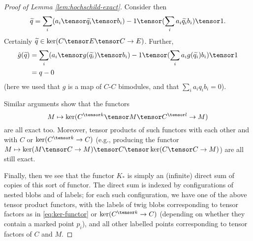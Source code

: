 \begin{proof}[Proof of Lemma \ref{lem:hochschild-exact}]
Consider then $$\widetilde{q} = \sum_i (a_i \tensor \widetilde{q_i} \tensor b_i) - 1 \tensor (\sum_i a_i \widetilde{q_i} b_i) \tensor 1.$$ Certainly
$\widetilde{q} \in \ker(C \tensor E \tensor C \to E)$. Further,
\begin{align*}
\hat{g}(\widetilde{q}) & = \sum_i (a_i \tensor g(\widetilde{q_i}) \tensor b_i) - 1 \tensor (\sum_i a_i g(\widetilde{q_i}) b_i) \tensor 1 \\
                       & = q - 0
\end{align*}
(here we used that $g$ is a map of $C$-$C$ bimodules, and that $\sum_i a_i q_i b_i = 0$).

Similar arguments show that the functors
\begin{equation}
\label{eq:ker-functor}%
M \mapsto \ker(C^{\tensor k} \tensor M \tensor C^{\tensor l} \to M)
\end{equation}
are all exact too. Moreover, tensor products of such functors with each
other and with $C$ or $\ker(C^{\tensor k} \to C)$ (e.g., producing the functor $M \mapsto \ker(M \tensor C \to M)
\tensor C \tensor \ker(C \tensor C \to M)$) are all still exact.

Finally, then we see that the functor $K_*$ is simply an (infinite)
direct sum of copies of this sort of functor. The direct sum is indexed by
configurations of nested blobs and of labels; for each such configuration, we have one of the above tensor product functors,
with the labels of twig blobs corresponding to tensor factors as in \eqref{eq:ker-functor} or $\ker(C^{\tensor k} \to C)$ (depending on whether they contain a marked point $p_i$), and all other labelled points corresponding
to tensor factors of $C$ and $M$.
\end{proof}
